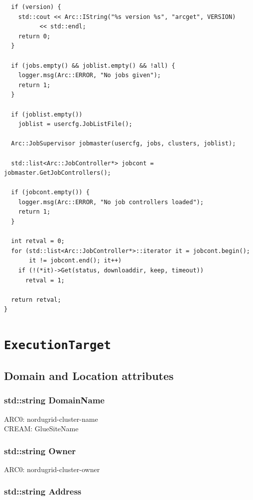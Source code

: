 \documentclass{book}
\newcommand{\ExecutionTarget}{\texttt{ExecutionTarget}}
\begin{document}
\begin{shaded}
\begin{verbatim}
  if (version) {
    std::cout << Arc::IString("%s version %s", "arcget", VERSION)
	      << std::endl;
    return 0;
  }

  if (jobs.empty() && joblist.empty() && !all) {
    logger.msg(Arc::ERROR, "No jobs given");
    return 1;
  }

  if (joblist.empty())
    joblist = usercfg.JobListFile();

  Arc::JobSupervisor jobmaster(usercfg, jobs, clusters, joblist);

  std::list<Arc::JobController*> jobcont = jobmaster.GetJobControllers();

  if (jobcont.empty()) {
    logger.msg(Arc::ERROR, "No job controllers loaded");
    return 1;
  }

  int retval = 0;
  for (std::list<Arc::JobController*>::iterator it = jobcont.begin();
       it != jobcont.end(); it++)
    if (!(*it)->Get(status, downloaddir, keep, timeout))
      retval = 1;

  return retval;
}
\end{verbatim}
\end{shaded}

\appendix

\chapter{{\ExecutionTarget}}
\label{app:ExTarget}

\section{Domain and Location attributes}

\subsection*{std::string DomainName}

ARC0: nordugrid-cluster-name \\
CREAM: GlueSiteName

\subsection*{std::string Owner}

ARC0: nordugrid-cluster-owner

\subsection*{std::string Address}
\end{document}
